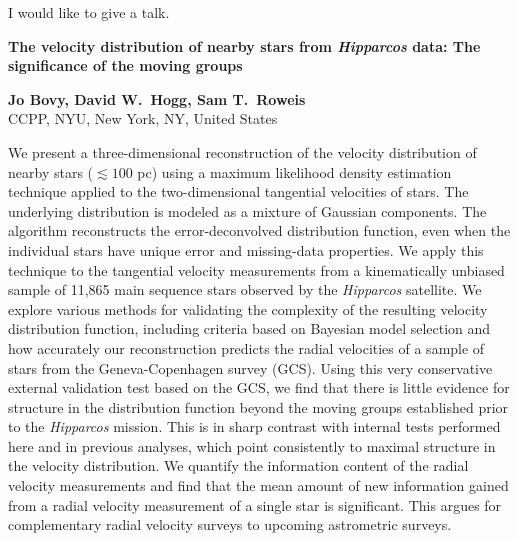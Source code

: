 \documentclass[]{article}
\begin{document}


I would like to give a talk.
\bigskip

\begin{center} 

{\Large \bf  {The velocity distribution of nearby stars from \emph{Hipparcos} data:
The significance of the moving groups}}

\end{center}

\begin{center}
{\large \bf   
Jo Bovy, David W.~Hogg, Sam T.~Roweis
}\\

{\small
CCPP, NYU, New York, NY, United States
}\\
\end{center}

We present a three-dimensional reconstruction of the velocity
distribution of nearby stars ($\lesssim 100$ pc) using a maximum
likelihood density estimation technique applied to the two-dimensional
tangential velocities of stars. The underlying distribution is modeled
as a mixture of Gaussian components. The algorithm reconstructs the
error-deconvolved distribution function, even when the individual
stars have unique error and missing-data properties. We apply this
technique to the tangential velocity measurements from a kinematically
unbiased sample of 11,865 main sequence stars observed by the
\emph{Hipparcos} satellite.  We explore various methods for validating
the complexity of the resulting velocity distribution function,
including criteria based on Bayesian model selection and how
accurately our reconstruction predicts the radial velocities of a
sample of stars from the Geneva-Copenhagen survey (GCS). Using this
very conservative external validation test based on the GCS, we find
that there is little evidence for structure in the distribution
function beyond the moving groups established prior to the
\emph{Hipparcos} mission. This is in sharp contrast with internal
tests performed here and in previous analyses, which point
consistently to maximal structure in the velocity distribution. We
quantify the information content of the radial velocity measurements
and find that the mean amount of new information gained from a radial
velocity measurement of a single star is significant. This argues for
complementary radial velocity surveys to upcoming astrometric surveys.

\bigskip
\bigskip

\end{document}
